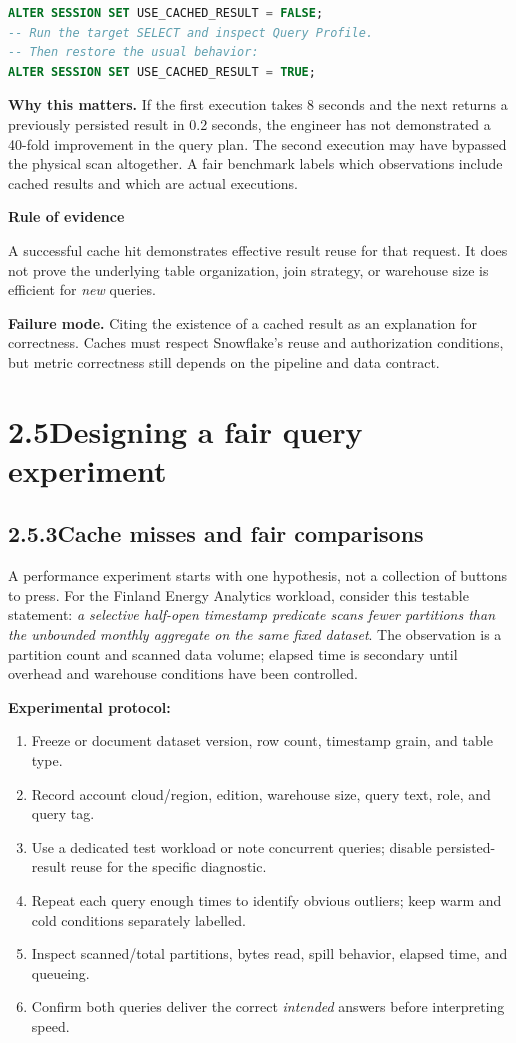 \documentclass[11pt,twoside]{article}
\newcommand{\topic}[2]{\subsection*{#1\quad #2}}
\begin{document}
\begin{lstlisting}[language=SQL,caption={Session-level control for a diagnostic, not a speed guarantee.}]
ALTER SESSION SET USE_CACHED_RESULT = FALSE;
-- Run the target SELECT and inspect Query Profile.
-- Then restore the usual behavior:
ALTER SESSION SET USE_CACHED_RESULT = TRUE;
\end{lstlisting}

\textbf{Why this matters.} If the first execution takes 8 seconds and the next returns a previously persisted result in 0.2 seconds, the engineer has not demonstrated a 40-fold improvement in the query plan. The second execution may have bypassed the physical scan altogether. A fair benchmark labels which observations include cached results and which are actual executions.

\begin{insight}
\textbf{Rule of evidence}\par
A successful cache hit demonstrates effective result reuse for that request. It does not prove the underlying table organization, join strategy, or warehouse size is efficient for \emph{new} queries.
\end{insight}
\textbf{Failure mode.} Citing the existence of a cached result as an explanation for correctness. Caches must respect Snowflake's reuse and authorization conditions, but metric correctness still depends on the pipeline and data contract.

\newpage
\section*{2.5\quad Designing a fair query experiment}
\topic{2.5.3}{Cache misses and fair comparisons}
A performance experiment starts with one hypothesis, not a collection of buttons to press. For the Finland Energy Analytics workload, consider this testable statement: \emph{a selective half-open timestamp predicate scans fewer partitions than the unbounded monthly aggregate on the same fixed dataset}. The observation is a partition count and scanned data volume; elapsed time is secondary until overhead and warehouse conditions have been controlled.

\textbf{Experimental protocol:}
\begin{enumerate}
\item Freeze or document dataset version, row count, timestamp grain, and table type.
\item Record account cloud/region, edition, warehouse size, query text, role, and query tag.
\item Use a dedicated test workload or note concurrent queries; disable persisted-result reuse for the specific diagnostic.
\item Repeat each query enough times to identify obvious outliers; keep warm and cold conditions separately labelled.
\item Inspect scanned/total partitions, bytes read, spill behavior, elapsed time, and queueing.
\item Confirm both queries deliver the correct \emph{intended} answers before interpreting speed.
\end{enumerate}
\end{document}
